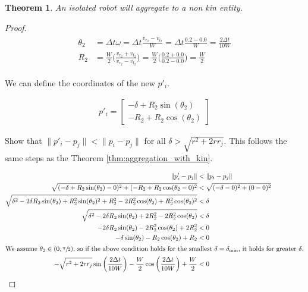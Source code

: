 \documentclass[conference]{IEEEtran}
\newtheorem{theorem}{Theorem}
\begin{document}
  \begin{theorem} \label{thm:aggregation_with_non_kin}
    An isolated robot will aggregate to a non kin entity.
  \end{theorem}
  \begin{proof}
    \begin{align}
      \begin{split} \label{eq:non_kin_theta_and_r}
        \theta_2 &= \Delta t\omega = \Delta t \frac{v_{r_2} - v_{l_2}}{W} = \Delta t \frac{0.2 - 0.0}{W} = \frac{2\Delta t}{10W} \\
        R_2 &= \frac{W}{2}\bigg(\frac{v_{r_2} + v_{l_2}}{v_{r_2} - v_{l_2}}\bigg) = \frac{W}{2}\bigg(\frac{0.2 + 0.0}{0.2 - 0.0}\bigg) = \frac{W}{2}
      \end{split}
    \end{align}

    We can define the coordinates of the new $p'_i$.

    \begin{align} \label{eq:non_kin_coordinates}
      p'_i = \begin{bmatrix}-\delta+R_2\sin(\theta_2) \\ -R_2+R_2\cos(\theta_2)\end{bmatrix}
    \end{align}

    Show that $\lVert p'_i - p_j\rVert < \lVert p_i - p_j\rVert$ for all $\delta > \sqrt{r^2+2rr_j}$. This follows the same steps as the Theorem \ref{thm:aggregation_with_kin}.

    \begin{align*}
      \lVert p'_i - p_j \rVert &< \lVert p_i - p_j \rVert \\
      \sqrt{(-\delta+R_2\sin(\theta_2)-0)^2 + (-R_2+R_2\cos(\theta_2-0)^2} &< \sqrt{(-\delta-0)^2 + (0-0)^2} \\
      \sqrt{\delta^2-2\delta R_2\sin(\theta_2) + R_2^2\sin(\theta_2)^2 + R_2^2-2R_2^2\cos(\theta_2)+R_2^2\cos(\theta_2)^2} &< \delta \\
      \sqrt{\delta^2-2\delta R_2\sin(\theta_2) + 2R_2^2-2R_2^2\cos(\theta_2)} &< \delta \\
      -2\delta R_2\sin(\theta_2) - 2R_2^2\cos(\theta_2) + 2R_2^2 &< 0 \\
      -\delta \sin(\theta_2) - R_2\cos(\theta_2) + R_2 &< 0 \\
      \intertext{We assume $\theta_2\in(0,\sfrac{\pi}{2})$, so if the above condition holds for the smallest $\delta=\delta_{\text{min}}$, it holds for greater $\delta$.}
      -\sqrt{r^2+2rr_j}\sin\bigg(\frac{2\Delta t}{10W}\bigg) - \frac{W}{2}\cos\bigg(\frac{2\Delta t}{10W}\bigg) + \frac{W}{2} &< 0
    \end{align*}
  \end{proof}
\end{document}
